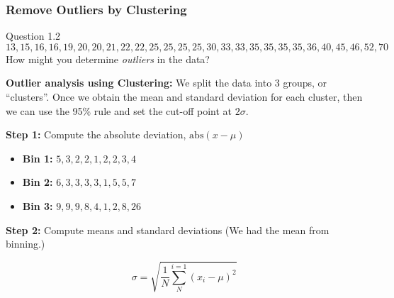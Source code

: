 \documentclass[aspectratio=169, 10pt]{beamer}
\begin{document}
\begin{frame}[t]
    \frametitle{Remove Outliers by Clustering}

    \begin{block}{Question 1.2}
        \[13,15,16,16,19,20,20,21,22,22,25,25,25,25,30,33,33,35,35,35,35,36,40,45,46,52,70\]
        How might you determine \textit{outliers} in the data?
    \end{block}

    \textbf{Outlier analysis using Clustering:} We split the data into 3 groups, or ``clusters''.
    Once we obtain the mean and standard deviation for each cluster, 
    then we can use the 95\% rule and set the cut-off point at $2\sigma$.

    \textbf{Step 1:} Compute the absolute deviation, $\text{abs}(x - \mu)$

    \begin{itemize}
        \item \textbf{Bin 1:} $5, 3, 2, 2, 1, 2, 2, 3, 4$
        \item \textbf{Bin 2:} $6, 3, 3, 3, 3, 1, 5, 5, 7$
        \item \textbf{Bin 3:} $ 9,  9,  9,  8,  4,  1,  2,  8, 26$
    \end{itemize}

    \textbf{Step 2:} Compute means and standard deviations (We had the mean from binning.) 

    \[\sigma = \sqrt{\frac{1}{N}\sum_{N}^{i=1}(x_i-\mu)^2}\]

\end{frame}
\end{document}
